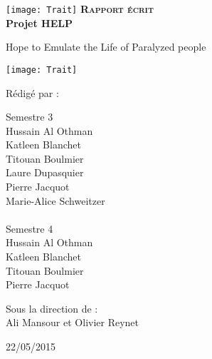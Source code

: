 \begingroup
\thispagestyle{empty}
\begin{center}
\vspace*{4.5cm}
\texttt{[image: Trait]}
{\Huge \textsc{\textbf{Rapport écrit}}}\\
\vspace*{1cm}
{\Huge \textbf{Projet HELP}}\par %
\vspace*{1cm}
{\huge Hope to Emulate the Life of Paralyzed people}\par %
\texttt{[image: Trait]}
\end{center}

\begin{center}
\large Rédigé par :\\
\end{center}

\begin{multicols}{2}
{\setlength{\baselineskip}{1.5\baselineskip}
{\large Semestre 3\\
Hussain Al Othman\\
Katleen Blanchet\\
Titouan Boulmier\\
Laure Dupasquier\\
Pierre Jacquot\\
Marie-Alice Schweitzer\\
\columnbreak\\
Semestre 4\\
Hussain Al Othman\\
Katleen Blanchet\\
Titouan Boulmier\\
Pierre Jacquot\\}
\par}
\end{multicols}

\begin{center}
\large
Sous la direction de :\\
Ali Mansour et Olivier Reynet
\end{center}

\vspace*{1.2cm}
\begin{center}
\large
22/05/2015
\end{center}


\endgroup
